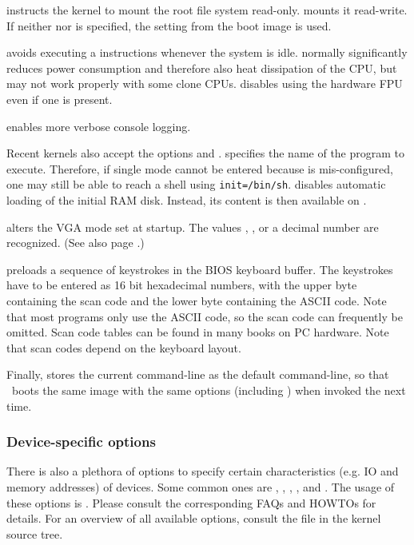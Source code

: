  instructs the kernel to mount the root file system read-only.
 mounts it read-write. If neither  nor  is
specified, the setting from the boot image is used.

 avoids executing a  instructions whenever the system
is idle.  normally significantly reduces power consumption and
therefore also heat
dissipation of the CPU, but may not work properly with some clone CPUs.
 disables using the hardware FPU even if one is present.

 enables more verbose console logging.

Recent kernels also accept the options  and
.  specifies the name of the  program
to execute. Therefore, if single mode cannot be entered because 
is mis-configured, one may still be able to reach a shell using
\verb"init=/bin/sh".  disables automatic loading of the initial
RAM disk. Instead, its content is then available on .

 alters the VGA mode set at startup. The values
, ,  or a decimal number are
recognized. (See also page \pageref{vga}.)

 preloads a sequence of keystrokes in the
BIOS keyboard buffer. The keystrokes have to be entered as 16 bit hexadecimal
numbers, with the upper byte containing the scan code and the lower byte
containing the ASCII code. Note that most programs only use the ASCII
code, so the scan code can frequently be omitted. Scan code tables can be
found in many books on PC hardware. Note that scan codes depend on the
keyboard layout.

Finally,  stores the current command-line as the default
command-line, so that \LILO\ boots the same image with the same options
(including ) when invoked the next time.


\subsubsection{Device-specific options}

There is also a plethora of options to specify certain characteristics
(e.g. IO and memory addresses) of devices. Some common ones are
, , , , and .
The usage of these options is .
Please consult the corresponding FAQs and HOWTOs for details. For an overview
of all available options, consult the file  in the kernel
source tree.


